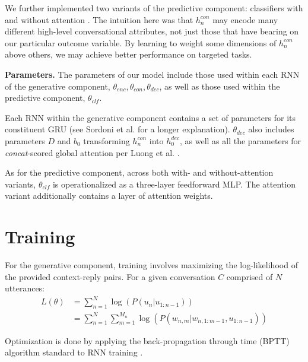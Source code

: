 \documentclass{article}
\newcommand{\fixme}[1]{\textcolor{red}{[FIXME: #1]}}
\begin{document}
We further implemented two variants of the predictive component: classifiers with and without attention \cite{luong2015effective}. The intuition here was that $h^{con}_n$ may encode many different high-level conversational attributes, not just those that have bearing on our particular outcome variable. By learning to weight some dimensions of $h^{con}_n$ above others, we may achieve better performance on targeted tasks.

\textbf{Parameters.} The parameters of our model include those used within each RNN of the generative component, $\theta_{enc}, \theta_{con}, \theta_{dec}$, as well as those used within the predictive component, $\theta_{clf}$.

Each RNN within the generative component contains a set of parameters for its constituent GRU (see Sordoni et al. \citeyear{sordoni2015hierarchical} for a longer explanation). $\theta_{dec}$ also includes parameters $D$ and $b_0$ transforming $h^{con}_n$ into $h^{dec}_0$, as well as all the parameters for \textit{concat}-scored global attention per Luong et al. \citeyear{luong2015effective}.

As for the predictive component, across both with- and without-attention variants, $\theta_{clf}$ is operationalized as a three-layer feedforward MLP. The attention variant additionally contains a layer of attention weights. 




\section{Training}
\label{sec:training}

For the generative component, training involves maximizing the log-likelihood of the provided context-reply pairs. For a given conversation $C$ comprised of $N$ utterances:
\begin{align}
  L(\theta) &= \sum^{N}_{n=1} \log(P(u_n|u_{1:n-1})) \\
  &= \sum^{N}_{n=1} \sum^{M_n}_{m=1} \log(P(w_{n,m}|w_{n,1:m-1}, u_{1:n-1}))
\end{align}

Optimization is done by applying the back-propagation through time (BPTT) algorithm standard to RNN training \cite{rumelhart1986learning}.
\end{document}
